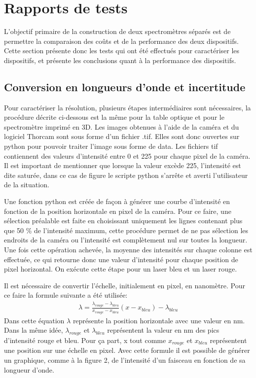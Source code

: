 \documentclass[11pt,letterpaper]{article}
\begin{document}
\section{Rapports de tests}

L'objectif primaire de la construction de deux spectromètres séparés est de permettre la 
comparaison des coûts et de la performance des deux dispositifs. Cette section présente
donc les tests qui ont été effectués pour caractériser les dispositifs, et présente les 
conclusions quant à la performance des dispositifs.

\subsection{Conversion en longueurs d'onde et incertitude}

Pour caractériser la résolution, plusieurs étapes intermédiaires sont nécessaires, la procédure décrite ci-dessous est la même 
pour la table optique et pour le spectromètre imprimé en 3D. 
Les images obtenues à l'aide de la caméra et du logiciel Thorcam sont sous forme d'un fichier .tif.
Elles sont donc ouvertes sur python pour pouvoir traiter l'image sous forme de data. Les fichiers tif 
contiennent des valeurs d'intensité entre 0 et 225 pour chaque pixel de la caméra. Il est important de mentionner
que lorsque la valeur excède 225, l'intensité est dite saturée, dans ce cas de figure le scripte python s'arrête et 
averti l'utilisateur de la situation. 

Une fonction python est créée de façon à générer une courbe d'intensité en fonction de la position horizontale 
en pixel de la caméra. Pour ce faire, une sélection préalable est faite en choisissant uniquement les lignes 
contenant plus que 50 \% de l'intensité maximum, cette procédure permet de ne pas sélection les endroits de la caméra 
ou l'intensité est complètement nul sur toutes la longueur. Une fois cette opération achevée, la moyenne des intensités sur chaque
colonne est effectuée, ce qui retourne donc une valeur d'intensité pour chaque position de pixel horizontal. On exécute cette étape pour 
un laser bleu et un laser rouge.

Il est nécessaire de convertir l'échelle, initialement en pixel, en nanomètre.
Pour ce faire la formule suivante a été utilisée: 
\begin{align}
  \lambda =\frac{\lambda _{rouge}-\lambda _{bleu}}{x_{rouge}-x_{bleu}}(x-x_{bleu})-\lambda _{bleu}
\end{align}
Dans cette équation $\lambda $ représente la position horizontale avec une valeur en nm. Dans la même idée, 
$\lambda _{rouge}$ et $\lambda _{bleu}$ représentent la valeur en nm des pics d'intensité rouge et bleu. 
Pour ça part, x tout comme $x_{rouge}$ et $x_{bleu}$ représentent une position sur une échelle en pixel.
Avec cette formule il est possible de générer un graphique, comme à la figure 2, de l'intensité d'un faisceau en fonction 
de sa longueur d'onde. 
\end{document}
